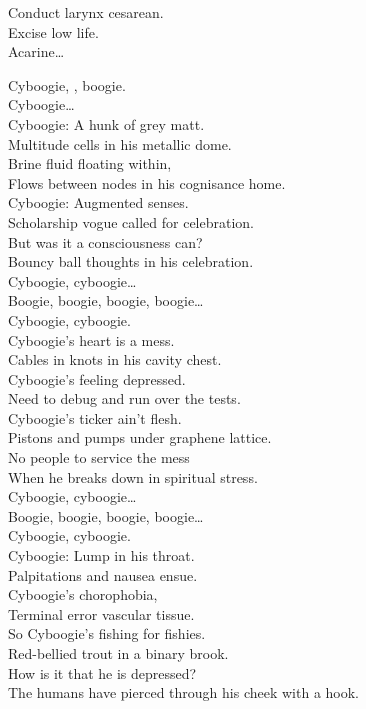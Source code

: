 Conduct larynx cesarean. \\
Excise low life. \\
Acarine… \\





Cyboogie, , boogie. \\
Cyboogie… \\

Cyboogie: A hunk of grey matt. \\
Multitude cells in his metallic dome. \\
Brine fluid floating within, \\
Flows between nodes in his cognisance home. \\
Cyboogie: Augmented senses. \\
Scholarship vogue called for celebration. \\
But was it a consciousness can? \\
Bouncy ball thoughts in his celebration. \\

Cyboogie, cyboogie… \\
Boogie, boogie, boogie, boogie… \\
Cyboogie, cyboogie. \\

Cyboogie's heart is a mess. \\
Cables in knots in his cavity chest. \\
Cyboogie's feeling depressed. \\
Need to debug and run over the tests. \\
Cyboogie's ticker ain't flesh. \\
Pistons and pumps under graphene lattice. \\
No people to service the mess \\
When he breaks down in spiritual stress. \\

Cyboogie, cyboogie… \\
Boogie, boogie, boogie, boogie… \\
Cyboogie, cyboogie. \\

Cyboogie: Lump in his throat. \\
Palpitations and nausea ensue. \\
Cyboogie's chorophobia, \\
Terminal error vascular tissue. \\
So Cyboogie's fishing for fishies. \\
Red-bellied trout in a binary brook. \\
How is it that he is depressed? \\
The humans have pierced through his cheek with a hook. \\

